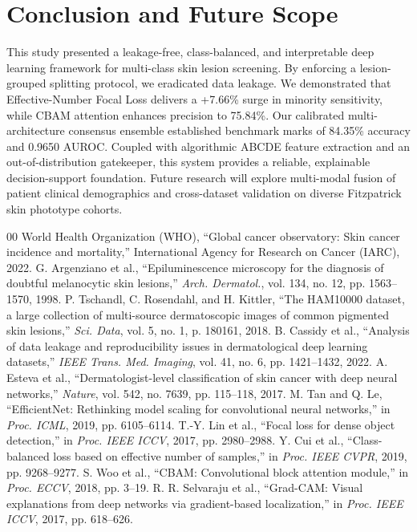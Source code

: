 \documentclass[conference]{IEEEtran}
\begin{document}
\section{Conclusion and Future Scope}
This study presented a leakage-free, class-balanced, and interpretable deep learning framework for multi-class skin lesion screening. By enforcing a lesion-grouped splitting protocol, we eradicated data leakage. We demonstrated that Effective-Number Focal Loss delivers a +7.66\% surge in minority sensitivity, while CBAM attention enhances precision to 75.84\%. Our calibrated multi-architecture consensus ensemble established benchmark marks of 84.35\% accuracy and 0.9650 AUROC. Coupled with algorithmic ABCDE feature extraction and an out-of-distribution gatekeeper, this system provides a reliable, explainable decision-support foundation. Future research will explore multi-modal fusion of patient clinical demographics and cross-dataset validation on diverse Fitzpatrick skin phototype cohorts.

\begin{thebibliography}{00}
 World Health Organization (WHO), ``Global cancer observatory: Skin cancer incidence and mortality,'' International Agency for Research on Cancer (IARC), 2022.
 G. Argenziano et al., ``Epiluminescence microscopy for the diagnosis of doubtful melanocytic skin lesions,'' \textit{Arch. Dermatol.}, vol. 134, no. 12, pp. 1563--1570, 1998.
 P. Tschandl, C. Rosendahl, and H. Kittler, ``The HAM10000 dataset, a large collection of multi-source dermatoscopic images of common pigmented skin lesions,'' \textit{Sci. Data}, vol. 5, no. 1, p. 180161, 2018.
 B. Cassidy et al., ``Analysis of data leakage and reproducibility issues in dermatological deep learning datasets,'' \textit{IEEE Trans. Med. Imaging}, vol. 41, no. 6, pp. 1421--1432, 2022.
 A. Esteva et al., ``Dermatologist-level classification of skin cancer with deep neural networks,'' \textit{Nature}, vol. 542, no. 7639, pp. 115--118, 2017.
 M. Tan and Q. Le, ``EfficientNet: Rethinking model scaling for convolutional neural networks,'' in \textit{Proc. ICML}, 2019, pp. 6105--6114.
 T.-Y. Lin et al., ``Focal loss for dense object detection,'' in \textit{Proc. IEEE ICCV}, 2017, pp. 2980--2988.
 Y. Cui et al., ``Class-balanced loss based on effective number of samples,'' in \textit{Proc. IEEE CVPR}, 2019, pp. 9268--9277.
 S. Woo et al., ``CBAM: Convolutional block attention module,'' in \textit{Proc. ECCV}, 2018, pp. 3--19.
 R. R. Selvaraju et al., ``Grad-CAM: Visual explanations from deep networks via gradient-based localization,'' in \textit{Proc. IEEE ICCV}, 2017, pp. 618--626.
\end{thebibliography}
\end{document}
